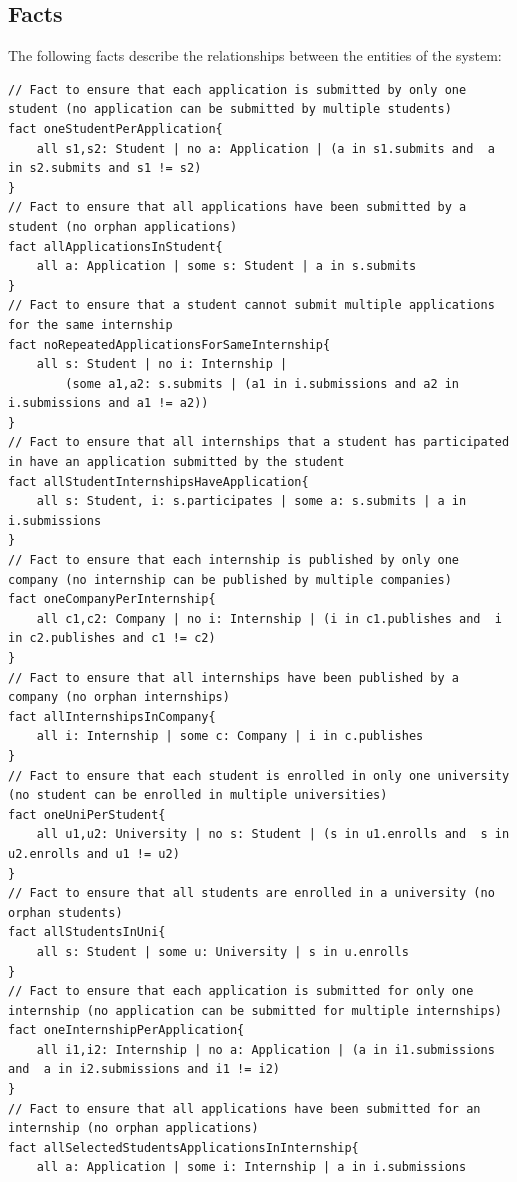 \subsection{Facts}
The following facts describe the relationships between the entities of the system:
\begin{lstlisting}
// Fact to ensure that each application is submitted by only one student (no application can be submitted by multiple students)
fact oneStudentPerApplication{
    all s1,s2: Student | no a: Application | (a in s1.submits and  a in s2.submits and s1 != s2)
}
// Fact to ensure that all applications have been submitted by a student (no orphan applications)
fact allApplicationsInStudent{
    all a: Application | some s: Student | a in s.submits
}
// Fact to ensure that a student cannot submit multiple applications for the same internship
fact noRepeatedApplicationsForSameInternship{
    all s: Student | no i: Internship | 
        (some a1,a2: s.submits | (a1 in i.submissions and a2 in i.submissions and a1 != a2))
}
// Fact to ensure that all internships that a student has participated in have an application submitted by the student
fact allStudentInternshipsHaveApplication{
    all s: Student, i: s.participates | some a: s.submits | a in i.submissions
}
// Fact to ensure that each internship is published by only one company (no internship can be published by multiple companies)
fact oneCompanyPerInternship{
    all c1,c2: Company | no i: Internship | (i in c1.publishes and  i in c2.publishes and c1 != c2)
}
// Fact to ensure that all internships have been published by a company (no orphan internships)
fact allInternshipsInCompany{
    all i: Internship | some c: Company | i in c.publishes
}
// Fact to ensure that each student is enrolled in only one university (no student can be enrolled in multiple universities)
fact oneUniPerStudent{
    all u1,u2: University | no s: Student | (s in u1.enrolls and  s in u2.enrolls and u1 != u2)
}
// Fact to ensure that all students are enrolled in a university (no orphan students)
fact allStudentsInUni{
    all s: Student | some u: University | s in u.enrolls
}
// Fact to ensure that each application is submitted for only one internship (no application can be submitted for multiple internships)
fact oneInternshipPerApplication{
    all i1,i2: Internship | no a: Application | (a in i1.submissions and  a in i2.submissions and i1 != i2)
}
// Fact to ensure that all applications have been submitted for an internship (no orphan applications)
fact allSelectedStudentsApplicationsInInternship{
    all a: Application | some i: Internship | a in i.submissions

\end{lstlisting}
